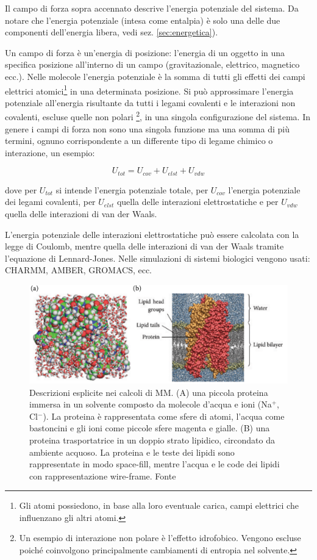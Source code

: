 {Il campo di forza sopra accennato descrive l'energia potenziale del sistema. Da notare che l'energia potenziale (intesa come entalpia) è solo una delle due componenti dell'energia libera, vedi sez. \ref{sec:energetica}).

\par Un campo di forza è un'energia di posizione: l'energia di un oggetto in una specifica posizione all'interno di un campo (gravitazionale, elettrico, magnetico ecc.). Nelle molecole l'energia potenziale è la somma di tutti gli effetti dei campi elettrici atomici\footnote{Gli atomi possiedono, in base alla loro eventuale carica, campi elettrici che influenzano gli altri atomi.} in una determinata posizione. Si può approssimare l'energia potenziale all'energia risultante da tutti i legami covalenti e le interazioni non covalenti, escluse quelle non polari \footnote{Un esempio di interazione non polare è l'effetto idrofobico. Vengono escluse poiché coinvolgono principalmente cambiamenti di entropia nel solvente.}, in una singola configurazione del sistema. In genere i campi di forza non sono una singola funzione ma una somma di più termini, ognuno corrispondente a un differente tipo di legame chimico o interazione, un esempio:

\[ U_{tot}=U_{cov}+U_{elst}+U_{vdw} \]

dove per $U_{tot}$ si intende l'energia potenziale totale, per $U_{cov}$ l'energia potenziale dei legami covalenti, per $U_{elst}$ quella delle interazioni elettrostatiche e per $U_{vdw}$ quella delle interazioni di van der Waals.

\par L'energia potenziale delle interazioni elettrostatiche può essere calcolata con la legge di Coulomb, mentre quella delle interazioni di van der Waals tramite l'equazione di Lennard-Jones. Nelle simulazioni di sistemi biologici vengono usati: CHARMM, AMBER, GROMACS, ecc.

\begin{figure}[!htb]
	\centering
	\includegraphics[scale=0.4]{images/esplicita-mm.png}
	\caption{Descrizioni esplicite nei calcoli di MM. (A) una piccola proteina immersa in un solvente composto da molecole d'acqua e ioni (Na$^{+}$, Cl$^{-}$). La proteina è rappresentata come sfere di atomi, l'acqua come bastoncini e gli ioni come piccole sfere magenta e gialle. (B) una proteina trasportatrice in un doppio strato lipidico, circondato da ambiente acquoso. La proteina e le teste dei lipidi sono rappresentate in modo space-fill, mentre l'acqua e le code dei lipidi con rappresentazione wire-frame. Fonte \cite{kessel_ben-tal_2018}}
	\label{fig:descrizione-esplicita-mm}
\end{figure}

}
